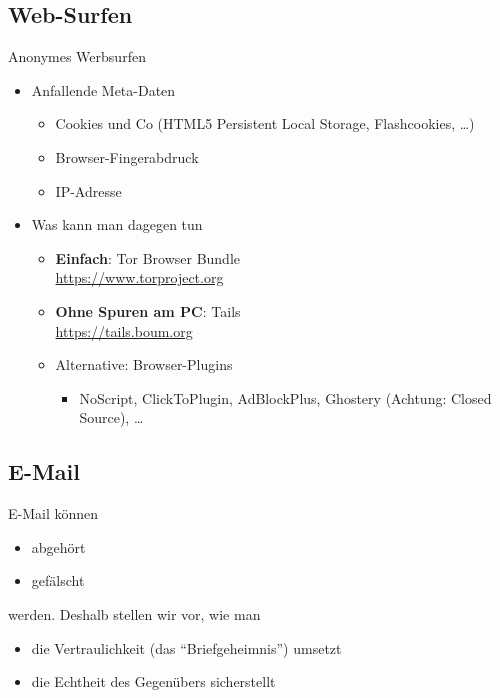   \subsection{Web-Surfen}
  \begin{frame}{Anonymes Werbsurfen}
    \begin{itemize}
      \item Anfallende Meta-Daten
      \begin{itemize}
        \item Cookies und Co (HTML5 Persistent Local Storage, Flashcookies, \ldots)
        \item Browser-Fingerabdruck
        \item IP-Adresse
      \end{itemize}
      \item Was kann man dagegen tun
      \begin{itemize}
        \item \textbf{Einfach}: Tor Browser Bundle\\ \url{https://www.torproject.org}\\[.5cm]
        \item \textbf{Ohne Spuren am PC}: Tails\\ \url{https://tails.boum.org}\\[.5cm]
        \item Alternative: Browser-Plugins
          \begin{itemize}
            \item NoScript, ClickToPlugin, AdBlockPlus, Ghostery (Achtung: Closed Source), \ldots 
          \end{itemize}
      \end{itemize}
    \end{itemize}
  \end{frame}

  \subsection{E-Mail}
  \begin{frame}
    E-Mail können
    \begin{itemize}
      \item abgehört
      \item gefälscht
    \end{itemize}
    werden. Deshalb stellen wir vor, wie man
    \begin{itemize}
      \item die Vertraulichkeit (das ``Briefgeheimnis'') umsetzt
      \item die Echtheit des Gegenübers sicherstellt
    \end{itemize}
  \end{frame}

